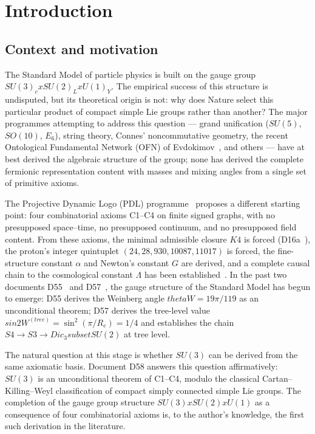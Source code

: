\documentclass[11pt,a4paper]{article}
\def\Sfour{S4}%
\def\Sthree{S3}%
\def\SUthree{SU(3)}%
\def\SUtwo{SU(2)}%
\def\Uone{U(1)}%
\def\Kfour{K4}%
\def\Re{Re}%
\def\PDL{PDL}%
\def\times{x}%
\def\subset{ subset }%
\def\Dic{Dic}%
\def\sinW{sin2W}%
\def\thetaW{thetaW}%
\def\mathrm#1{#1}%
\def\textsc#1{#1}%
\theoremstyle{plain}
\theoremstyle{definition}
\theoremstyle{remark}
\newcommand{\PDL}{\textsc{PDL}}
\newcommand{\Kfour}{K_4}
\newcommand{\Sfour}{S_4}
\newcommand{\Sthree}{S_3}
\newcommand{\SUthree}{\mathrm{SU}(3)}
\newcommand{\SUtwo}{\mathrm{SU}(2)}
\newcommand{\Uone}{\mathrm{U}(1)}
\newcommand{\Dic}{\mathrm{Dic}}
\renewcommand{\Re}{R_e}
\newcommand{\thetaW}{\theta_W}
\newcommand{\sinW}{\sin^2\!\thetaW}
\begin{document}
\tableofcontents

\clearpage

\section{Introduction}
\label{sec:intro}

\subsection{Context and motivation}
\label{subsec:context}

The Standard Model of particle physics is built on the gauge group $\SUthree_{\mathrm{c}} \times \SUtwo_{\mathrm{L}} \times \Uone_{\mathrm{Y}}$. The empirical success of this structure is undisputed, but its theoretical origin is not: why does Nature select this particular product of compact simple Lie groups rather than another? The major programmes attempting to address this question --- grand unification ($\mathrm{SU}(5)$, $\mathrm{SO}(10)$, $E_6$), string theory, Connes' noncommutative geometry, the recent Ontological Fundamental Network (OFN) of Evdokimov~\cite{PDL_N01}, and others --- have at best derived the algebraic structure of the group; none has derived the complete fermionic representation content with masses and mixing angles from a single set of primitive axioms.

The Projective Dynamic Logo (\PDL) programme~\cite{PDL_DM} proposes a different starting point: four combinatorial axioms C1--C4 on finite signed graphs, with no presupposed space--time, no presupposed continuum, and no presupposed field content. From these axioms, the minimal admissible closure $\Kfour$ is forced (D16a~\cite{PDL_D16a}), the proton's integer quintuplet $(24,28,930,10087,11017)$ is forced, the fine-structure constant $\alpha$ and Newton's constant $G$ are derived, and a complete causal chain to the cosmological constant $\Lambda$ has been established~\cite{PDL_D55,PDL_DS01,PDL_DM}. In the past two documents D55~\cite{PDL_D55} and D57~\cite{PDL_D57}, the gauge structure of the Standard Model has begun to emerge: D55 derives the Weinberg angle $\thetaW = 19\pi/119$ as an unconditional theorem; D57 derives the tree-level value $\sinW^{(\mathrm{tree})} = \sin^2(\pi/\Re) = 1/4$ and establishes the chain $\Sfour \to \Sthree \to \Dic_3 \subset \SUtwo$ at tree level.

The natural question at this stage is whether $\SUthree$ can be derived from the same axiomatic basis. Document D58 answers this question affirmatively: $\SUthree$ is an unconditional theorem of C1--C4, modulo the classical Cartan--Killing--Weyl classification of compact simply connected simple Lie groups. The completion of the gauge group structure $\SUthree \times \SUtwo \times \Uone$ as a consequence of four combinatorial axioms is, to the author's knowledge, the first such derivation in the literature.
\end{document}
